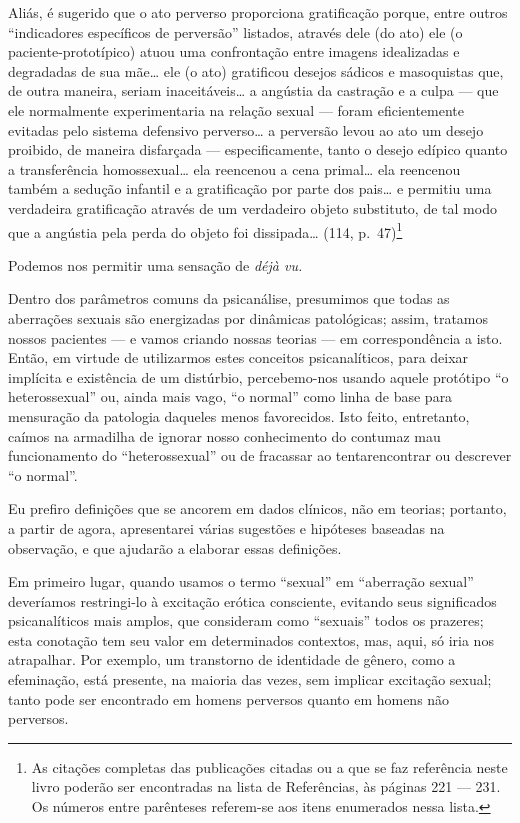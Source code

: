 Aliás, é sugerido que o ato perverso proporciona gratificação
porque, entre outros ``indicadores específicos de
perversão'' listados, através dele (do ato) ele (o
paciente-prototípico) atuou uma confrontação entre imagens idealizadas
e degradadas de sua\idxmaes{} mãe\ldots{} ele (o ato) gratificou desejos sádicos e
masoquistas que, de outra maneira, seriam inaceitáveis\ldots{} a angústia da
 castração\idxcasta{} e a culpa --- que ele normalmente experimentaria na relação
sexual --- foram eficientemente evitadas pelo sistema defensivo
perverso\ldots{} a perversão levou ao ato um desejo proibido, de maneira
disfarçada --- especificamente, tanto o desejo edípico\idxconfe{} quanto a
transferência homossexual\ldots{}\idxhomos{} ela reencenou a cena primal\ldots{} ela
reencenou também a sedução infantil e a gratificação por parte dos
pais\ldots{} e permitiu uma verdadeira gratificação através de um verdadeiro
objeto substituto, de tal modo que a angústia pela perda do objeto foi
dissipada\ldots{} (114, p.~47)\footnote{ As citações completas das
publicações citadas ou a que se faz referência neste livro poderão ser
encontradas na lista de Referências, às páginas 221 --- 231. Os
números entre parênteses referem-se aos itens enumerados nessa lista.}

Podemos nos permitir uma sensação de \textit{déjà vu.}

Dentro dos parâmetros comuns da psicanálise, presumimos que todas as
aberrações sexuais são energizadas por dinâmicas patológicas; assim,
tratamos nossos pacientes --- e vamos criando nossas teorias --- em
correspondência a isto. Então, em virtude de utilizarmos estes
conceitos psicanalíticos, para deixar implícita e existência de um
distúrbio, percebemo-nos usando aquele protótipo ``o
heterossexual''\idxhetero{} ou, ainda mais vago, ``o
normal''\idxnorma{} como linha de base para mensuração da patologia
daqueles menos favorecidos. Isto feito, entretanto, caímos na armadilha
de ignorar nosso conhecimento do contumaz mau funcionamento do
``heterossexual'' ou de fracassar ao tentar\idxpsicap[|)]
encontrar ou descrever ``o normal''.\idxpervnorma{}

Eu prefiro definições que se ancorem em dados clínicos, não em
teorias; portanto, a partir de agora, apresentarei várias sugestões e
hipóteses baseadas na observação, e que ajudarão a elaborar essas
definições.

Em primeiro lugar,\idxaberrdef{} quando usamos o termo ``sexual'' em ``aberração
sexual'' deveríamos restringi-lo à excitação\idxsexue{} erótica
consciente, evitando seus significados psicanalíticos mais amplos, que
consideram como ``sexuais'' todos os
prazeres; esta conotação tem seu valor em determinados contextos, mas,
aqui, só iria nos atrapalhar. Por exemplo, um transtorno de identidade
de gênero,\idxiden{} como a efeminação,\idxhomosafem{} está presente, na maioria das vezes, sem
implicar excitação sexual; tanto pode ser encontrado em homens
perversos quanto em homens não perversos.

